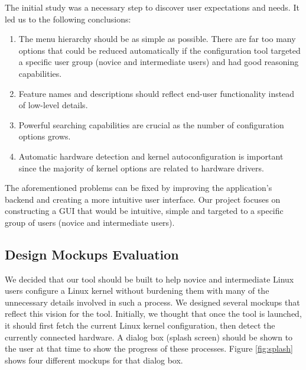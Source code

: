 \documentclass{chi2009}
\begin{document}

The initial study was a necessary step to discover user expectations and needs. It led us to the following conclusions:
\begin{enumerate}
\item The menu hierarchy should be as simple as possible. There are far too many options that could be reduced automatically if the configuration tool targeted
a specific user group (novice and intermediate users) and had good reasoning capabilities.
\item Feature names and descriptions should reflect end-user functionality instead of low-level details.
\item Powerful searching capabilities are crucial as the number of configuration options grows.
\item Automatic hardware detection and kernel autoconfiguration is important since the majority of kernel options are related to hardware drivers.
\end{enumerate}

The aforementioned problems can be fixed by improving the application's backend and creating a more intuitive user interface. Our project focuses on
constructing a GUI that would be intuitive, simple and targeted to a specific group of users (novice and intermediate users).


\subsection{Design Mockups Evaluation}
We decided that our tool should be built to help novice and intermediate Linux users configure a Linux kernel without burdening them with many of the unnecessary
details involved in such a process. We designed several mockups that reflect this vision for the tool. Initially, we thought that once the tool is launched, it
should first fetch the current Linux kernel configuration, then detect the currently connected hardware. A dialog box (splash screen) should be shown to the
user at that time to show the progress of these processes. Figure \ref{fig:splash} shows four different mockups for that dialog box.
\end{document}
